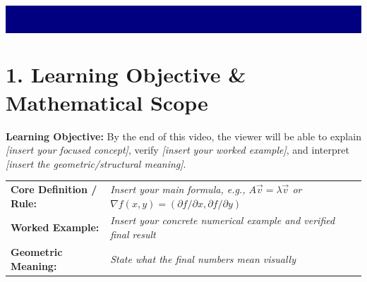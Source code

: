 \documentclass[10pt,a4paper]{article}
\begin{document}
\noindent\colorbox{navy}{\parbox{\dimexpr\textwidth-2\fboxsep\relax}{%
\vspace{8pt}
\\[4pt]
\\[6pt]
\vspace{8pt}
}}

\vspace{8pt}

\section*{\color{slate}1. Learning Objective \& Mathematical Scope}
\textbf{Learning Objective:} By the end of this video, the viewer will be able to explain \textit{[insert your focused concept]}, verify \textit{[insert your worked example]}, and interpret \textit{[insert the geometric/structural meaning]}.

\vspace{4pt}
\noindent\colorbox{rowtint}{\parbox{\dimexpr\textwidth-2\fboxsep\relax}{%
\vspace{4pt}
\begin{tabularx}{\linewidth}{@{}l X@{}}
\textbf{Core Definition / Rule:} & \textit{Insert your main formula, e.g., $A\vec{v} = \lambda\vec{v}$ or $\nabla f(x,y) = (\partial f/\partial x, \partial f/\partial y)$} \\[4pt]
\textbf{Worked Example:} & \textit{Insert your concrete numerical example and verified final result} \\[4pt]
\textbf{Geometric Meaning:} & \textit{State what the final numbers mean visually}
\end{tabularx}
\vspace{4pt}
}}
\end{document}
